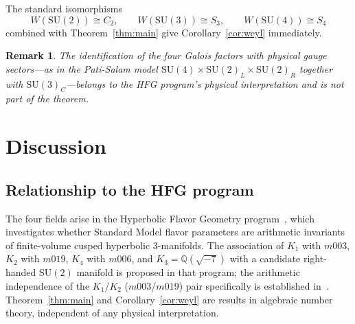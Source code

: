 \documentclass[12pt]{amsart}
\newtheorem{remark}[theorem]{Remark}
\newcommand{\Q}{\mathbb{Q}}
\begin{document}
The standard isomorphisms
\[
W(\mathrm{SU}(2))\cong C_2,\qquad W(\mathrm{SU}(3))\cong S_3,\qquad
W(\mathrm{SU}(4))\cong S_4
\]
combined with Theorem~\ref{thm:main} give Corollary~\ref{cor:weyl} immediately.

\begin{remark}
The identification of the four Galois factors with physical gauge
sectors---as in the Pati-Salam model
$\mathrm{SU}(4)\times\mathrm{SU}(2)_L\times\mathrm{SU}(2)_R$ together
with $\mathrm{SU}(3)_C$---belongs to the HFG program's physical
interpretation and is not part of the theorem.
\end{remark}

\section{Discussion}\label{sec:discussion}

\subsection{Relationship to the HFG program}
The four fields arise in the Hyperbolic Flavor Geometry
program~\cite{HFG}, which investigates whether Standard Model flavor
parameters are arithmetic invariants of finite-volume cusped hyperbolic
3-manifolds.
The association of $K_1$ with $m003$, $K_2$ with $m019$, $K_4$ with
$m006$, and $K_3=\Q(\sqrt{-7})$ with a candidate right-handed $\mathrm{SU}(2)$
manifold is proposed in that program; the arithmetic independence of the
$K_1$/$K_2$ ($m003$/$m019$) pair specifically is established
in~\cite{DualSurgery}. Theorem~\ref{thm:main} and
Corollary~\ref{cor:weyl} are results in algebraic number theory,
independent of any physical interpretation.
\end{document}
